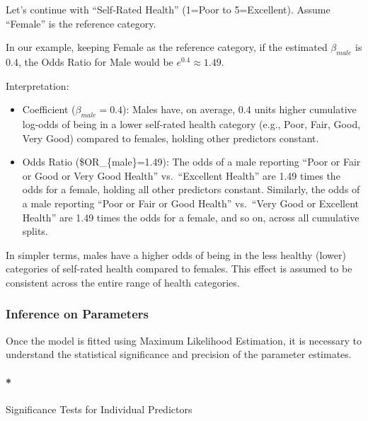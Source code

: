 \documentclass[
  letterpaper,
  DIV=11,
  numbers=noendperiod]{scrartcl}
\let\oldparagraph\paragraph
\renewcommand{\paragraph}[1]{\oldparagraph{#1}\mbox{}}
\begin{document}
Let's continue with ``Self-Rated Health'' (1=Poor to 5=Excellent).
Assume ``Female'' is the reference category.

In our example, keeping Female as the reference category, if the
estimated \(\beta_{male}\) is 0.4, the Odds Ratio for Male would be
\(e^{0.4}\approx 1.49\).

Interpretation:

\begin{itemize}
\item
  Coefficient (\(\beta_{male}=0.4\)): Males have, on average, 0.4 units
  higher cumulative log-odds of being in a lower self-rated health
  category (e.g., Poor, Fair, Good, Very Good) compared to females,
  holding other predictors constant.
\item
  Odds Ratio (\$OR\_\{male\}=1.49): The odds of a male reporting ``Poor
  or Fair or Good or Very Good Health'' vs.~``Excellent Health'' are
  1.49 times the odds for a female, holding all other predictors
  constant. Similarly, the odds of a male reporting ``Poor or Fair or
  Good Health'' vs.~``Very Good or Excellent Health'' are 1.49 times the
  odds for a female, and so on, across all cumulative splits.
\end{itemize}

In simpler terms, males have a higher odds of being in the less healthy
(lower) categories of self-rated health compared to females. This effect
is assumed to be consistent across the entire range of health
categories.

\hypertarget{inference-on-parameters}{%
\subsubsection*{Inference on Parameters}\label{inference-on-parameters}}

Once the model is fitted using Maximum Likelihood Estimation, it is
necessary to understand the statistical significance and precision of
the parameter estimates.

\hypertarget{significance-tests-for-individual-predictors}{%
\paragraph*{Significance Tests for Individual
Predictors}\label{significance-tests-for-individual-predictors}}
\end{document}
